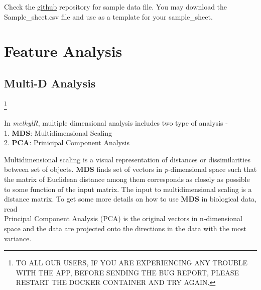 \documentclass[
  a4paper,
  oneside,
  open=any]{scrreport}
\begin{document}
\begin{tcolorbox}[enhanced jigsaw, bottomrule=.15mm, left=2mm, coltitle=black, breakable, colback=white, arc=.35mm, rightrule=.15mm, opacitybacktitle=0.6, toptitle=1mm, leftrule=.75mm, toprule=.15mm, bottomtitle=1mm, opacityback=0, colbacktitle=quarto-callout-tip-color!10!white, titlerule=0mm, colframe=quarto-callout-tip-color-frame, title=\textcolor{quarto-callout-tip-color}{\faLightbulb}\hspace{0.5em}{Tip}]

Check the
\href{https://github.com/JD2112/methylr/tree/main/data}{github}
repository for sample data file. You may download the Sample\_sheet.csv
file and use as a template for your sample\_sheet.

\end{tcolorbox}

\part{Feature Analysis}

\hypertarget{sec-multid}{%
\chapter{Multi-D Analysis}\label{sec-multid}}

\footnote{TO ALL OUR USERS, IF YOU ARE EXPERIENCING ANY TROUBLE WITH THE
  APP, BEFORE SENDING THE BUG REPORT, PLEASE RESTART THE DOCKER
  CONTAINER AND TRY AGAIN.}

In \emph{methylR}, multiple dimensional analysis includes two type of
analysis -\\
1. \textbf{MDS}: Multidimensional Scaling\\
2. \textbf{PCA}: Prinicipal Component Analysis

Multidimensional scaling is a visual representation of distances or
dissimilarities between set of objects. \textbf{MDS} finds set of
vectors in \emph{p}-dimensional space such that the matrix of Euclidean
distance among them corresponds as closely as possible to some function
of the input matrix. The input to multidimensional scaling is a distance
matrix. To get some more details on how to use \textbf{MDS} in
biological data, read
\autocite{mugavin2008multidimensional,lacher1987interpretation,lacher1988comparison}\\
Principal Component Analysis (PCA) is the original vectors in
n-dimensional space and the data are projected onto the directions in
the data with the most variance.
\end{document}
